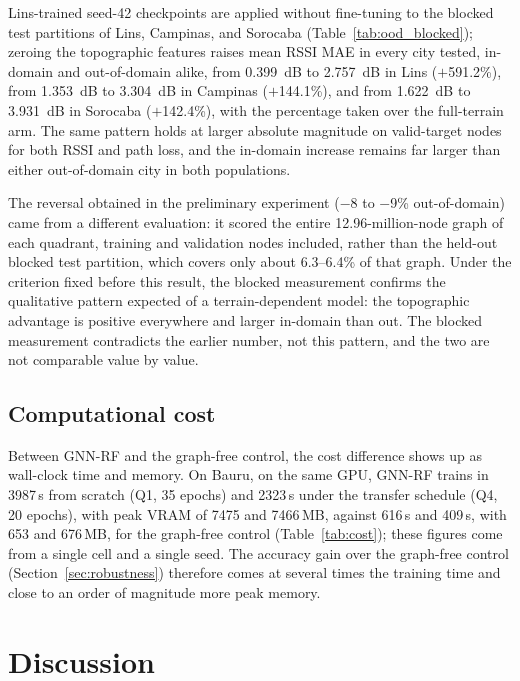\documentclass{ieeeaccess}
\begin{document}
Lins-trained seed-42 checkpoints are applied without fine-tuning to the blocked test partitions of Lins, Campinas, and Sorocaba (Table~\ref{tab:ood_blocked}); zeroing the topographic features raises mean RSSI MAE in every city tested, in-domain and out-of-domain alike, from \SI{0.399}{\deci\bel} to \SI{2.757}{\deci\bel} in Lins ($+$591.2\%), from \SI{1.353}{\deci\bel} to \SI{3.304}{\deci\bel} in Campinas ($+$144.1\%), and from \SI{1.622}{\deci\bel} to \SI{3.931}{\deci\bel} in Sorocaba ($+$142.4\%), with the percentage taken over the full-terrain arm. The same pattern holds at larger absolute magnitude on valid-target nodes for both RSSI and path loss, and the in-domain increase remains far larger than either out-of-domain city in both populations.

The reversal obtained in the preliminary experiment ($-$8 to $-$9\% out-of-domain) came from a different evaluation: it scored the entire 12.96-million-node graph of each quadrant, training and validation nodes included, rather than the held-out blocked test partition, which covers only about 6.3--6.4\% of that graph. Under the criterion fixed before this result, the blocked measurement confirms the qualitative pattern expected of a terrain-dependent model: the topographic advantage is positive everywhere and larger in-domain than out. The blocked measurement contradicts the earlier number, not this pattern, and the two are not comparable value by value.



\subsection{Computational cost}

Between GNN-RF and the graph-free control, the cost difference shows up as wall-clock time and memory. On Bauru, on the same GPU, GNN-RF trains in 3987\,s from scratch (Q1, 35 epochs) and 2323\,s under the transfer schedule (Q4, 20 epochs), with peak VRAM of 7475 and 7466\,MB, against 616\,s and 409\,s, with 653 and 676\,MB, for the graph-free control (Table~\ref{tab:cost}); these figures come from a single cell and a single seed. The accuracy gain over the graph-free control (Section~\ref{sec:robustness}) therefore comes at several times the training time and close to an order of magnitude more peak memory.




\section{Discussion}
\label{sec:discussion}
\end{document}
